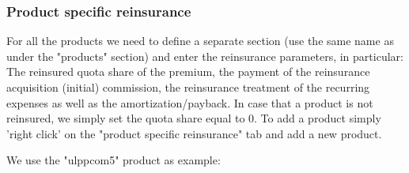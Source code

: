 \subsubsection{Product specific reinsurance}

For all the products we need to define a separate section (use the same name as under the "products" section) and enter the reinsurance parameters, in particular: The reinsured quota share of the premium, the payment of the reinsurance acquisition (initial) commission, the reinsurance treatment of the recurring expenses as well as the amortization/payback. In case that a product is not reinsured, we simply set the quota share equal to 0. To add a product simply 'right click' on the "product specific reinsurance" tab and add a new product.

We use the "ulppcom5" product as example:
